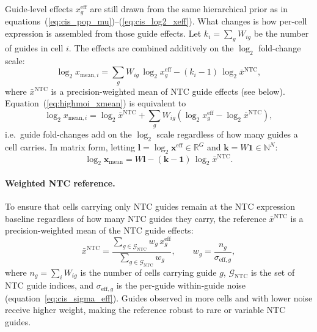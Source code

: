 \documentclass[12pt]{article}
\begin{document}
Guide-level effects $x_g^{\mathrm{eff}}$ are still drawn from the same hierarchical prior
as in equations~(\ref{eq:cis_pop_mu})--(\ref{eq:cis_log2_xeff}).
%
What changes is how per-cell expression is assembled from those guide effects.
Let $k_i = \sum_g W_{ig}$ be the number of guides in cell $i$.
The effects are combined additively on the $\log_2$ fold-change scale:
\begin{equation}
  \log_2 x_{\mathrm{mean},i}
    = \sum_{g} W_{ig}\,\log_2 x_g^{\mathrm{eff}}
      - (k_i - 1)\,\log_2 \bar x^{\mathrm{NTC}},
  \label{eq:highmoi_xmean}
\end{equation}
%
where $\bar x^{\mathrm{NTC}}$ is a precision-weighted mean of NTC guide effects
(see below).
Equation~(\ref{eq:highmoi_xmean}) is equivalent to
\begin{equation*}
  \log_2 x_{\mathrm{mean},i}
    = \log_2 \bar x^{\mathrm{NTC}}
      + \sum_g W_{ig}\!\left(\log_2 x_g^{\mathrm{eff}} - \log_2 \bar x^{\mathrm{NTC}}\right),
\end{equation*}
i.e.\ guide fold-changes add on the $\log_2$ scale regardless of how many guides a
cell carries.
In matrix form, letting $\mathbf{l} = \log_2 \mathbf{x}^{\mathrm{eff}} \in \mathbb{R}^G$
and $\mathbf{k} = W\mathbf{1} \in \mathbb{N}^N$:
\begin{equation}
  \log_2 \mathbf{x}_{\mathrm{mean}} = W\mathbf{l} - (\mathbf{k} - \mathbf{1})\,\log_2 \bar x^{\mathrm{NTC}}.
\end{equation}

\paragraph{Weighted NTC reference.}

To ensure that cells carrying only NTC guides remain at the NTC expression baseline
regardless of how many NTC guides they carry, the reference $\bar x^{\mathrm{NTC}}$
is a precision-weighted mean of the NTC guide effects:
\begin{equation}
  \bar x^{\mathrm{NTC}}
    = \frac{\displaystyle\sum_{g \in \mathcal{G}_{\mathrm{NTC}}} w_g\, x_g^{\mathrm{eff}}}
           {\displaystyle\sum_{g \in \mathcal{G}_{\mathrm{NTC}}} w_g},
  \qquad
  w_g = \frac{n_g}{\sigma_{\mathrm{eff},g}},
\end{equation}
where $n_g = \sum_i W_{ig}$ is the number of cells carrying guide $g$,
$\mathcal{G}_{\mathrm{NTC}}$ is the set of NTC guide indices, and $\sigma_{\mathrm{eff},g}$
is the per-guide within-guide noise (equation~\ref{eq:cis_sigma_eff}).
Guides observed in more cells and with lower noise receive higher weight, making the
reference robust to rare or variable NTC guides.
\end{document}
